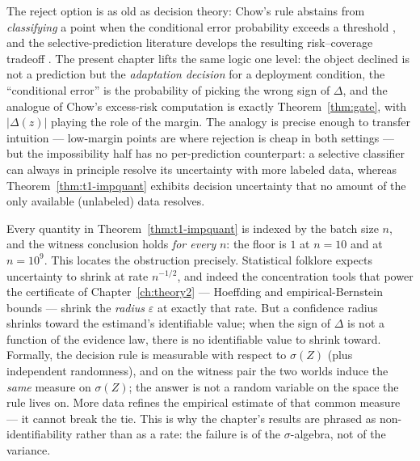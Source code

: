 \begin{remark}\label{rem:t1-selective}
The reject option is as old as decision theory: Chow's rule abstains from
\emph{classifying} a point when the conditional error probability exceeds
a threshold \cite{chow1970optimum}, and the selective-prediction
literature develops the resulting risk--coverage tradeoff
\cite{elyaniv2010selective, geifman2017selective}. The present chapter
lifts the same logic one level: the object declined is not a prediction
but the \emph{adaptation decision} for a deployment condition, the
``conditional error'' is the probability of picking the wrong sign of
$\Delta$, and the analogue of Chow's excess-risk computation is exactly
Theorem~\ref{thm:gate}, with $|\Delta(z)|$ playing the role of the margin.
The analogy is precise enough to transfer intuition --- low-margin points
are where rejection is cheap in both settings --- but the impossibility
half has no per-prediction counterpart: a selective classifier can always
in principle resolve its uncertainty with more labeled data, whereas
Theorem~\ref{thm:t1-impquant} exhibits decision uncertainty that no amount
of the only available (unlabeled) data resolves.
\end{remark}

\begin{remark}\label{rem:t1-measurability}
Every quantity in Theorem~\ref{thm:t1-impquant} is indexed by the batch
size $n$, and the witness conclusion holds \emph{for every} $n$: the floor
is $1$ at $n=10$ and at $n=10^{9}$. This locates the obstruction
precisely. Statistical folklore expects uncertainty to shrink at rate
$n^{-1/2}$, and indeed the concentration tools that power the certificate
of Chapter~\ref{ch:theory2} --- Hoeffding and empirical-Bernstein bounds
\cite{hoeffding1963probability, maurer2009empirical} --- shrink the
\emph{radius} $\varepsilon$ at exactly that rate. But a confidence radius
shrinks toward the estimand's identifiable value; when the sign of
$\Delta$ is not a function of the evidence law, there is no identifiable
value to shrink toward. Formally, the decision rule is measurable with
respect to $\sigma(Z)$ (plus independent randomness), and on the witness
pair the two worlds induce the \emph{same} measure on $\sigma(Z)$; the
answer is not a random variable on the space the rule lives on. More data
refines the empirical estimate of that common measure --- it cannot break
the tie. This is why the chapter's results are phrased as
non-identifiability rather than as a rate: the failure is of the
$\sigma$-algebra, not of the variance.
\end{remark}

